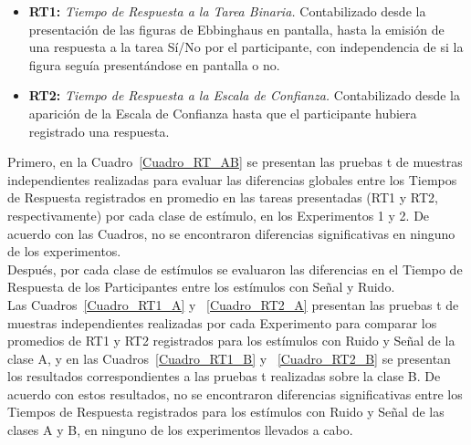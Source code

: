 \begin{itemize}
\item \textbf{RT1:} \textit{Tiempo de Respuesta a la Tarea Binaria.}  Contabilizado desde la presentación de las figuras de Ebbinghaus en pantalla, hasta la emisión de una respuesta a la tarea Sí/No por el participante, con independencia de si la figura seguía presentándose en pantalla o no.\\

\item \textbf{RT2:} \textit{Tiempo de Respuesta a la Escala de Confianza.} Contabilizado desde la aparición de la Escala de Confianza hasta que el participante hubiera registrado una respuesta.\\
\end{itemize}

Primero, en la Cuadro~\ref{Cuadro_RT_AB} se presentan las pruebas t de muestras independientes realizadas para evaluar las diferencias globales entre los Tiempos de Respuesta registrados en promedio en las tareas presentadas (RT1 y RT2, respectivamente) por cada clase de estímulo, en los Experimentos 1 y 2. De acuerdo con las Cuadros, no se encontraron diferencias significativas en ninguno de los experimentos.\\

Después, por cada clase de estímulos se evaluaron las diferencias en el Tiempo de Respuesta de los Participantes entre los estímulos con Señal y Ruido.\\

Las Cuadros~\ref{Cuadro_RT1_A} y ~\ref{Cuadro_RT2_A} presentan las pruebas t de muestras independientes realizadas por cada Experimento para comparar los promedios de RT1 y RT2 registrados para los estímulos con Ruido y Señal de la clase A, y en las Cuadros~\ref{Cuadro_RT1_B} y ~\ref{Cuadro_RT2_B} se presentan los resultados correspondientes a las pruebas t realizadas sobre la clase B. De acuerdo con estos resultados, no se encontraron diferencias significativas entre los Tiempos de Respuesta registrados para los estímulos con Ruido y Señal de las clases A y B, en ninguno de los experimentos llevados a cabo.\\



